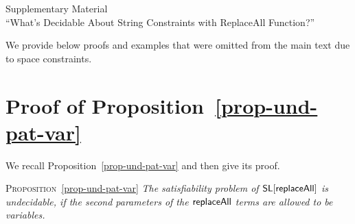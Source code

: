
\appendix

\begin{center}
{\huge Supplementary Material} \\
{\large ``What's Decidable About String Constraints with ReplaceAll Function?''} 
\end{center}

\bigskip

We provide below proofs and examples that were omitted from the main text due to space constraints.

\def\refpropundpat{\ref{prop-und-pat-var}}

\section{Proof of Proposition~\protect\refpropundpat}
\label{sec:prop-und-pat-var-proof}

We recall Proposition~\ref{prop-und-pat-var} and then give its proof.

\medskip

\noindent \textsc{Proposition}~\ref{prop-und-pat-var}
{\em The satisfiability problem of $\mathsf{SL}[\mathsf{replaceAll}]$ is undecidable, if the second parameters of the $\mathsf{replaceAll}$ terms are allowed to be variables.
}

